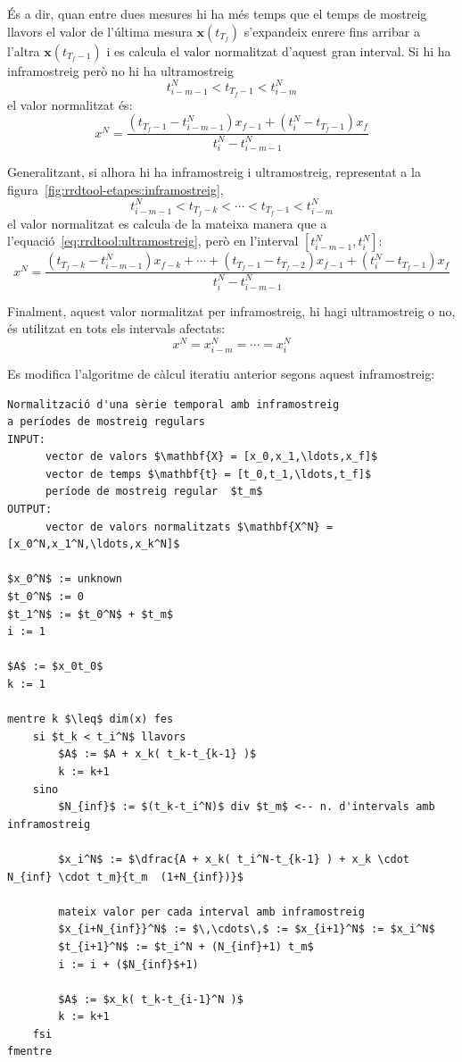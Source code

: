 És a dir, quan entre dues mesures hi ha més temps que el temps de mostreig llavors el valor de l'última mesura $\mathbf{x}(t_{T_f})$ s'expandeix enrere fins arribar a l'altra $\mathbf{x}(t_{T_f-1})$  i es calcula el valor normalitzat d'aquest gran interval. Si hi ha inframostreig però no hi ha ultramostreig
$$
t^N_{i-m-1} < t_{T_f-1} < t^N_{i-m} 
$$ 
el valor normalitzat és:
$$
x^N = \frac{ (t_{T_f-1}-t^N_{i-m-1})x_{f-1} + (t^N_i-t_{T_f-1})x_f }{t^N_i - t^N_{i-m-1}}
$$

Generalitzant, si alhora hi ha inframostreig i ultramostreig, representat a la figura~\ref{fig:rrdtool-etapes:inframostreig},
\[
t^N_{i-m-1} <  t_{T_f-k} <\cdots< t_{T_f-1}  < t^N_{i-m} 
\] 
el valor normalitzat es calcula de la mateixa manera que a l'equació~\ref{eq:rrdtool:ultramostreig}, però en l'interval $[t^N_{i-m-1},t^N_i]$:
\begin{equation}\label{eq:rrdtool:inframostreig}
x^N = \frac{ (t_{T_f-k}-t^N_{i-m-1})x_{f-k} + \cdots + (t_{T_f-1}-t_{T_f-2})x_{f-1} + (t^N_{i}-t_{T_f-1})x_f }{t^N_i - t^N_{i-m-1}}
\end{equation}

Finalment, aquest valor normalitzat per inframostreig, hi hagi ultramostreig o no, és utilitzat en tots els intervals afectats:
\[
x^N = x^N_{i-m} = \cdots = x^N_{i}
\]


Es modifica l'algoritme de càlcul iteratiu anterior segons aquest inframostreig:

\begin{lstlisting}[mathescape=true]
Normalització d'una sèrie temporal amb inframostreig
a períodes de mostreig regulars 
INPUT: 
      vector de valors $\mathbf{X} = [x_0,x_1,\ldots,x_f]$ 
      vector de temps $\mathbf{t} = [t_0,t_1,\ldots,t_f]$
      període de mostreig regular  $t_m$
OUTPUT: 
      vector de valors normalitzats $\mathbf{X^N} = [x_0^N,x_1^N,\ldots,x_k^N]$

$x_0^N$ := unknown
$t_0^N$ := 0
$t_1^N$ := $t_0^N$ + $t_m$
i := 1

$A$ := $x_0t_0$
k := 1

mentre k $\leq$ dim(x) fes
    si $t_k < t_i^N$ llavors
        $A$ := $A + x_k( t_k-t_{k-1} )$
        k := k+1
    sino 
        $N_{inf}$ := $(t_k-t_i^N)$ div $t_m$ <-- n. d'intervals amb inframostreig

        $x_i^N$ := $\dfrac{A + x_k( t_i^N-t_{k-1} ) + x_k \cdot N_{inf} \cdot t_m}{t_m  (1+N_{inf})}$

        mateix valor per cada interval amb inframostreig
        $x_{i+N_{inf}}^N$ := $\,\cdots\,$ := $x_{i+1}^N$ := $x_i^N$
        $t_{i+1}^N$ := $t_i^N + (N_{inf}+1) t_m$
        i := i + ($N_{inf}$+1)
                
        $A$ := $x_k( t_k-t_{i-1}^N )$
        k := k+1
    fsi 
fmentre
\end{lstlisting}

